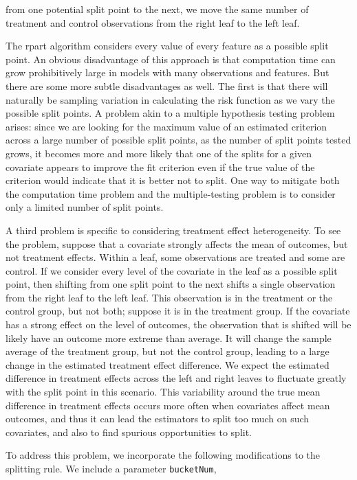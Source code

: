 \documentclass[11pt]{article}
\begin{document}
from one potential split point to the next, we move the same number of treatment and control observations from the right leaf to the left leaf.  \par
The rpart algorithm considers every value of every feature as a possible split point.
An obvious disadvantage of this approach is that computation time can grow prohibitively large in models with many observations
and features.  But there are some more subtle disadvantages as well. The first is that there will naturally be sampling variation
in calculating the risk function as we vary the possible split points. A problem akin to a multiple hypothesis testing problem arises:
since we are looking for the maximum value of an estimated criterion across a large number of possible split points,
as the number of split points tested grows, it becomes more and more likely that one of the splits for a given covariate appears to improve the fit criterion even if the true
value of the criterion would indicate that it is better not to split.  One way to mitigate both the computation time problem and
the multiple-testing problem is to consider only a limited number of split points. \par
A third problem is specific to considering treatment effect heterogeneity.  To see the problem, suppose that a covariate
strongly affects the mean of outcomes, but not treatment effects.  Within a leaf, some observations are treated and some
are control. If we consider every level of the covariate in the leaf as a possible split point, then shifting from one split point to the
next shifts a single observation from the right leaf to the left leaf.  This observation is in the treatment or the control group,
but not both; suppose it is in the treatment group.  If the covariate has a strong effect on the level of outcomes, the observation that is shifted will be likely have an
outcome more extreme than average. It will change the sample average of the treatment group, but not the control group, leading
to a large change in the estimated treatment effect difference.
We expect the estimated difference in treatment effects across the left and right leaves to fluctuate greatly with the split point in this scenario.  This
variability around the true mean difference in treatment effects occurs more often when covariates affect mean outcomes, and thus it
can lead the estimators to split too much on such covariates, and also to find spurious opportunities to split.\par
To address this problem, we incorporate the following modifications to the splitting rule.  We include a parameter \texttt{bucketNum},
\end{document}

